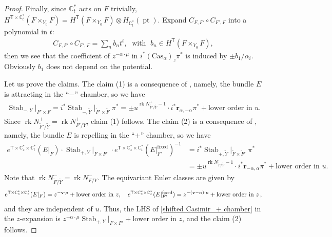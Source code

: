\documentclass[10pt]{amsart}
\theoremstyle{definition}
\numberwithin{equation}{section}
\newcommand{\bC}{\mathbb{C}}
\newcommand{\bv}{\mathbf{v}}
\newcommand{\sT}{\mathsf{T}}
\newcommand{\pt}{\operatorname{pt}}
\newcommand{\rk}{\operatorname{rk}}
\newcommand{\Stab}{\operatorname{Stab}}
\begin{document}
\begin{proof}
Finally, since $\bC^*_t$ acts on $F$ trivially, $H^{\sT\times \bC^*_t}(F\times_{Y_0} F)=H^{\sT}(F\times_{Y_0} F)\otimes H_{\bC^*_t}(\pt)$. Expand $C_{F,F'}\circ C_{F',F}$ into a polynomial in $t$: 
\begin{align*}
C_{F,F'}\circ C_{F',F}=\sum_{n}b_n t^t,\;\text{ with }\;b_n\in H^{\sT}(F\times_{Y_0} F),
\end{align*}
then we see that the coefficient of $z^{-\alpha\cdot \mu}$ in $i^*(\mathrm{Cas}_{\alpha})_z\pi^*$ is induced by $\pm b_1/\alpha_i$. Obviously $b_1$ does not depend on the potential.


Let us prove the claims. The claim (1) is a consequence of \cite[Prop.~8.2]{COZZ}, namely, the bundle $E$ is attracting in the ``$-$'' chamber, so we have
\begin{align*}
\Stab_{-,Y}\big|_{F'\times F}=i^*\Stab_{-,\widetilde Y}\big|_{\widetilde F'\times \widetilde F}\;\pi^*=\pm u^{\rk N^+_{\widetilde F'/\widetilde Y}-1}\cdot i^*\pmb r_{\alpha,-\alpha}\pi^*+\text{lower order in $u$}.
\end{align*}
Since $\rk N^+_{\widetilde F'/\widetilde Y}=\rk N^+_{F'/Y}$, claim (1) follows. The claim (2) is a consequence of \cite[Prop.~8.3]{COZZ}, namely, the bundle $E$ is repelling in the ``$+$'' chamber, so we have
\begin{equation}\label{shifted Casimir_+ chamber}
\begin{split}
e^{\sT\times \bC^*_z\times \bC^*_t}(E|_F)\cdot\Stab_{+,Y}\big|_{F\times F'}\;\cdot e^{\sT\times \bC^*_z\times \bC^*_t}(E|_{F'}^{\mathrm{fixed}})^{-1}&= i^*\Stab_{+,\widetilde Y}\big|_{\widetilde F\times \widetilde F'}\;\pi^*\\
&=\pm u^{\rk N^-_{\widetilde F/\widetilde Y}-1}\cdot i^*\pmb r_{-\alpha,\alpha}\pi^*+\text{lower order in $u$}.
\end{split}
\end{equation}
Note that $\rk N^-_{\widetilde F/\widetilde Y}=\rk N^-_{F/Y}$. The equivariant Euler classes are given by
\begin{align*}
e^{\sT\times \bC^*_z\times \bC^*_t}(E|_F)=z^{-\bv\cdot \mu}+\text{lower order in $z$},\quad e^{\sT\times \bC^*_z\times \bC^*_t}(E|_{F'}^{\mathrm{fixed}})=z^{-(\bv-\alpha)\cdot\mu}+\text{lower order in $z$\,,}
\end{align*}
and they are independent of $u$. Thus, the LHS of \eqref{shifted Casimir_+ chamber} in the $z$-expansion is $z^{-\alpha\cdot\mu}\Stab_{+,Y}\big|_{F\times F'}+\text{lower order in $z$}$, and the claim (2) follows.
\end{proof}
\end{document}
